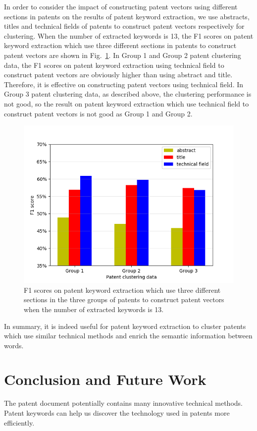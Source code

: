 \documentclass[conference]{IEEEtran}
\begin{document}
	In order to consider the impact of constructing patent vectors using different sections in patents on the results of patent keyword extraction, we use abstracts, titles and technical fields of patents to construct patent vectors respectively for clustering. When the number of extracted keywords is 13, the F1 scores on patent keyword extraction which use three different sections in patents to construct patent vectors are shown in Fig.~\ref{zzt}. In Group 1 and Group 2 patent clustering data, the F1 scores on patent keyword extraction using technical field to construct patent vectors are obviously higher than using abstract and title. Therefore, it is effective on constructing patent vectors using technical field. In Group 3 patent clustering data, as described above, the clustering performance is not good, so the result on patent keyword extraction which use technical field to construct patent vectors is not good as Group 1 and Group 2.
	
	\begin{figure}[ht]
		\centering
		\includegraphics[scale=0.49]{zzt.png} 
		\caption{F1 scores on patent keyword extraction which use three different sections in the three groups of patents to construct patent vectors when the number of extracted keywords is 13.}
		\label{zzt}
	\end{figure}
	
	In summary, it is indeed useful for patent keyword extraction to cluster patents which use similar technical methods and enrich the semantic information between words.
	
	\section{Conclusion and Future Work}
	The patent document potentially contains many innovative technical methods. Patent keywords can help us discover the technology used in patents more efficiently.
	
\end{document}
